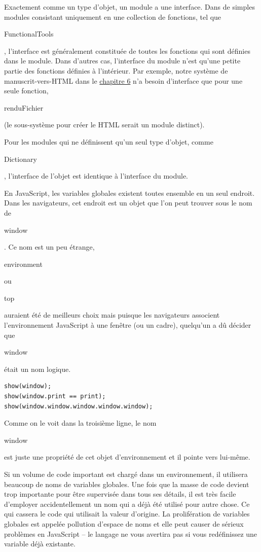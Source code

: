 \documentclass{FramateX}
\renewcommand{\texttt}[1]{\begin{sffamily}{#1}\end{sffamily}}
\begin{document}
\begin{center}\end{center}

Exactement comme un type d'objet, un module a une interface. Dans de
simples modules consistant uniquement en une collection de fonctions,
tel que \texttt{FunctionalTools}, l'interface est généralement
constituée de toutes les fonctions qui sont définies dans le module.
Dans d'autres cas, l'interface du module n'est qu'une petite partie des
fonctions définies à l'intérieur. Par exemple, notre système de
manuscrit-vers-HTML dans le \href{chapter6.html}{chapitre 6} n'a besoin
d'interface que pour une seule fonction, \texttt{renduFichier} (le
sous-système pour créer le HTML serait un module distinct).

Pour les modules qui ne définissent qu'un seul type d'objet, comme
\texttt{Dictionary}, l'interface de l'objet est identique à l'interface
du module.

\begin{center}\end{center}

En JavaScript, les variables globales existent toutes ensemble en un
seul endroit. Dans les navigateurs, cet endroit est un objet que l'on
peut trouver sous le nom de \texttt{window}. Ce nom est un peu étrange,
\texttt{environment} ou \texttt{top} auraient été de meilleurs choix
mais puisque les navigateurs associent l'environnement JavaScript à une
fenêtre (ou un cadre), quelqu'un a dû décider que \texttt{window} était
un nom logique.

\begin{lstlisting}
show(window);
show(window.print == print);
show(window.window.window.window.window);
\end{lstlisting}
Comme on le voit dans la troisième ligne, le nom \texttt{window} est
juste une propriété de cet objet d'environnement et il pointe vers
lui-même.

\begin{center}\end{center}

Si un volume de code important est chargé dans un environnement, il
utilisera beaucoup de noms de variables globales. Une fois que la masse
de code devient trop importante pour être supervisée dans tous ses
détails, il est très facile d'employer accidentellement un nom qui a
déjà été utilisé pour autre chose. Ce qui cassera le code qui utilisait
la valeur d'origine. La prolifération de variables globales est appelée
pollution d'espace de noms et elle peut causer de sérieux problèmes en
JavaScript -- le langage ne vous avertira pas si vous redéfinissez une
variable déjà existante.
\end{document}
